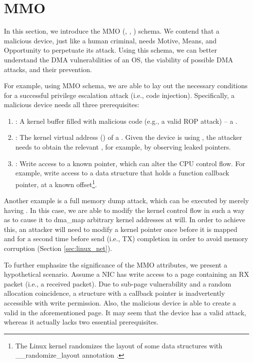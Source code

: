 \section{MMO}\label{sec:mmo}

In this section, we introduce the MMO (\motivation, \means, \oportunity) schema. We contend that a malicious device, just like a human criminal, needs Motive, Means, and Opportunity to perpetuate its attack. Using this schema, we can better understand the DMA vulnerabilities of an OS, the viability of possible DMA attacks, and their prevention. 

For example, using MMO schema, we are able to lay out the necessary conditions for a successful privilege escalation attack (i.e., code injection). Specifically, a malicious device needs all three prerequisites:
\begin{enumerate}
    \item \motivation: A kernel buffer filled with malicious code (e.g., a valid ROP attack) -- a \mabaf.
    \item \means: The kernel virtual address (\kva) of a \mabaf. Given the device is using \iova, the attacker needs to obtain the relevant \kva{}, for example, by observing leaked pointers. 
    \item \oportunity: Write access to a known pointer, which can alter the CPU control flow. For example, write access to a data structure that holds a function callback pointer, at a known offset\footnote{The Linux kernel randomizes the layout of some data structures with \_\_randomize\_layout annotation \cite{rand_layout}.}.
\end{enumerate}

Another example is a full memory dump attack, which can be executed by merely having \oportunity. In this case, we are able to modify the kernel control flow in such a way as to cause it to dma\_map arbitrary kernel addresses at will. In order to achieve this, an attacker will need to modify a kernel pointer once before it is mapped and for a second time before send (i.e., TX) completion in order to avoid memory corruption (Section \ref{sec:linux_net}). 

To further emphasize the significance of the MMO attributes, we present a hypothetical scenario. Assume a NIC has write access to a page containing an RX packet (i.e., a received packet). Due to sub-page vulnerability and a random allocation coincidence, a structure with a callback pointer is inadvertently accessible with write permission. Also, the malicious device is able to create a valid \mabaf{} in the aforementioned page. It may seem that the device has a valid attack, whereas it actually lacks two essential prerequisites.

